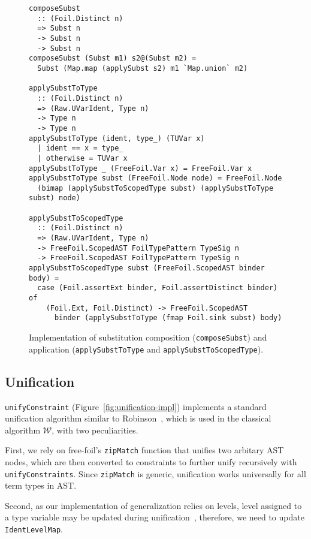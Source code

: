 \begin{figure}[H]
\begin{verbatim}
composeSubst
  :: (Foil.Distinct n)
  => Subst n
  -> Subst n
  -> Subst n
composeSubst (Subst m1) s2@(Subst m2) =
  Subst (Map.map (applySubst s2) m1 `Map.union` m2)

applySubstToType
  :: (Foil.Distinct n)
  => (Raw.UVarIdent, Type n)
  -> Type n
  -> Type n
applySubstToType (ident, type_) (TUVar x)
  | ident == x = type_
  | otherwise = TUVar x
applySubstToType _ (FreeFoil.Var x) = FreeFoil.Var x
applySubstToType subst (FreeFoil.Node node) = FreeFoil.Node
  (bimap (applySubstToScopedType subst) (applySubstToType subst) node)

applySubstToScopedType
  :: (Foil.Distinct n)
  => (Raw.UVarIdent, Type n)
  -> FreeFoil.ScopedAST FoilTypePattern TypeSig n
  -> FreeFoil.ScopedAST FoilTypePattern TypeSig n
applySubstToScopedType subst (FreeFoil.ScopedAST binder body) =
  case (Foil.assertExt binder, Foil.assertDistinct binder) of
    (Foil.Ext, Foil.Distinct) -> FreeFoil.ScopedAST
      binder (applySubstToType (fmap Foil.sink subst) body)
\end{verbatim}
  \caption[Substitution composition and application]{Implementation of substitution composition (\texttt{composeSubst}) and application (\texttt{applySubstToType} and \texttt{applySubstToScopedType}).}
  \label{fig:impl-substitution}
\end{figure}

\subsection{Unification}

\texttt{unifyConstraint} (Figure~\ref{fig:unification-impl}) implements a standard unification algorithm similar to Robinson~\cite{Robinson1965}, which is used in the classical algorithm $\mathcal{W}$, with two peculiarities.

First, we rely on free-foil's \texttt{zipMatch} function that unifies two arbitary AST nodes, which are then converted to constraints to further unify recursively with \texttt{unifyConstraints}. Since \texttt{zipMatch} is generic, unification works universally for all term types in AST.

Second, as our implementation of generalization relies on levels, level assigned to a type variable may be updated during unification~\cite{Kiselyov2022_OCamplTypeChecker}, therefore, we need to update \texttt{IdentLevelMap}.

